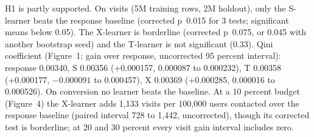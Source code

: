 H1 is partly supported. On visits (5M training rows, 2M holdout), only the \mbox{S-learner} beats the response baseline (corrected p~0.015 for 3 tests; significant means below 0.05). The \mbox{X-learner} is borderline (corrected p~0.075, or 0.045 with another bootstrap seed) and the \mbox{T-learner} is not significant (0.33). Qini coefficient (Figure~1; gain over response, uncorrected 95 percent interval): response 0.00340, S 0.00356 (+0.000157, 0.000087 to 0.000232), T 0.00358 (+0.000177, $-0.000091$ to 0.000457), X 0.00369 (+0.000285, 0.000016 to 0.000526). On conversion no learner beats the baseline. At a 10 percent budget (Figure~4) the \mbox{X-learner} adds 1,133 visits per 100,000 users contacted over the response baseline (paired interval 728 to 1,442, uncorrected), though its corrected test is borderline; at 20 and 30 percent every visit gain interval includes zero.
